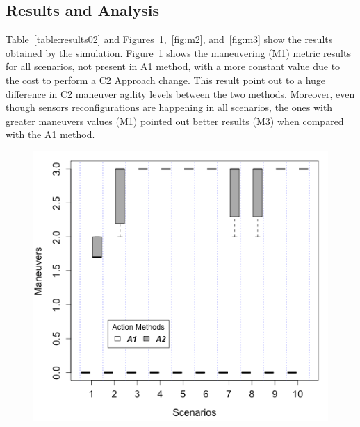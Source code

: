 \subsection{Results and Analysis}

Table~\ref{table:results02} and Figures~\ref{fig:m1},~\ref{fig:m2}, and~\ref{fig:m3} show the results obtained by the simulation. Figure~\ref{fig:m1} shows the maneuvering (M1) metric results for all scenarios, not present in A1 method, with a more constant value due to the cost to perform a C2 Approach change. This result point out to a huge difference in C2 maneuver agility levels between the two methods. Moreover, even though sensors reconfigurations are happening in all scenarios, the ones with greater maneuvers values (M1) pointed out better results (M3) when compared with the A1 method.

\begin{figure}[ht]
\centering
\begin{minipage}{.5\textwidth}
    \centering
    \small
    \fontsize{7}{7}\selectfont
    \label{table:results02}
    
\end{minipage}%
\begin{minipage}{.5\textwidth}
  \centering
  \includegraphics[width=0.95\linewidth]{figures/graphs/Boxplot_M2.png}
  \label{fig:m1}
\end{minipage}
\end{figure}


